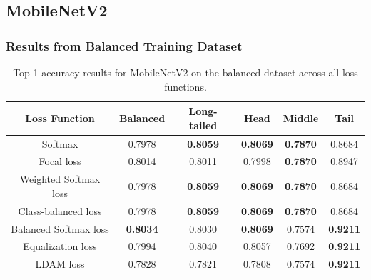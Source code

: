 \subsection{MobileNetV2}

\subsubsection{Results from Balanced Training Dataset}

\begin{table}[H]
    \centering
    \caption{Top-1 accuracy results for MobileNetV2 on the balanced dataset across all loss functions.}
    \begin{tabular}{cccccc}
        \toprule
        Loss Function & Balanced & Long-tailed & Head & Middle & Tail \\ 
        \midrule
        Softmax   & 0.7978   & \textbf{0.8059} & \textbf{0.8069} & \textbf{0.7870} & 0.8684 \\
        Focal loss   & 0.8014   & 0.8011 & 0.7998 & \textbf{0.7870} & 0.8947 \\
        Weighted Softmax loss   & 0.7978   & \textbf{0.8059} & \textbf{0.8069} & \textbf{0.7870} & 0.8684 \\
        Class-balanced loss   & 0.7978   & \textbf{0.8059} & \textbf{0.8069} & \textbf{0.7870} & 0.8684 \\
        Balanced Softmax loss   & \textbf{0.8034}  & 0.8030 & \textbf{0.8069} & 0.7574 & \textbf{0.9211} \\
        Equalization loss   & 0.7994   & 0.8040 & 0.8057 & 0.7692 & \textbf{0.9211} \\
        LDAM loss   &  0.7828   & 0.7821 & 0.7808 & 0.7574 & \textbf{0.9211} \\
        \bottomrule
    \end{tabular}
    \label{tab:mobilenet_bal_acc1_1}
\end{table}



